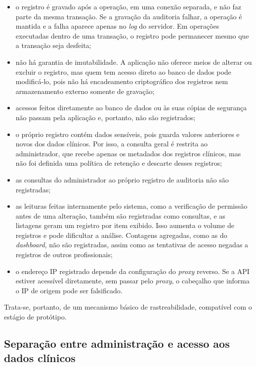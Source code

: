\begin{itemize}
    \item o registro é gravado após a operação, em uma conexão separada, e não faz parte da mesma transação. Se a gravação da auditoria falhar, a operação é mantida e a falha aparece apenas no \textit{log} do servidor. Em operações executadas dentro de uma transação, o registro pode permanecer mesmo que a transação seja desfeita;
    \item não há garantia de imutabilidade. A aplicação não oferece meios de alterar ou excluir o registro, mas quem tem acesso direto ao banco de dados pode modificá-lo, pois não há encadeamento criptográfico dos registros nem armazenamento externo somente de gravação;
    \item acessos feitos diretamente ao banco de dados ou às suas cópias de segurança não passam pela aplicação e, portanto, não são registrados;
    \item o próprio registro contém dados sensíveis, pois guarda valores anteriores e novos dos dados clínicos. Por isso, a consulta geral é restrita ao administrador, que recebe apenas os metadados dos registros clínicos, mas não foi definida uma política de retenção e descarte desses registros;
    \item as consultas do administrador ao próprio registro de auditoria não são registradas;
    \item as leituras feitas internamente pelo sistema, como a verificação de permissão antes de uma alteração, também são registradas como consultas, e as listagens geram um registro por item exibido. Isso aumenta o volume de registros e pode dificultar a análise. Contagens agregadas, como as do \textit{dashboard}, não são registradas, assim como as tentativas de acesso negadas a registros de outros profissionais;
    \item o endereço IP registrado depende da configuração do \textit{proxy} reverso. Se a API estiver acessível diretamente, sem passar pelo \textit{proxy}, o cabeçalho que informa o IP de origem pode ser falsificado.
\end{itemize}

Trata-se, portanto, de um mecanismo básico de rastreabilidade, compatível com o estágio de protótipo.

\subsection{Separação entre administração e acesso aos dados clínicos}\label{sec:separacao_admin}

